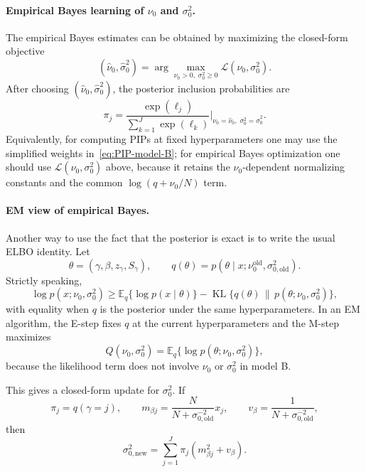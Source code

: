 \documentclass[11pt]{article}
\newcommand{\E}{\mathbb E}
\begin{document}
\paragraph{Empirical Bayes learning of $\nu_0$ and $\sigma_0^2$.}
The empirical Bayes estimates can be obtained by maximizing the closed-form
objective
\[
(\hat\nu_0,\hat\sigma_0^2)
=
\arg\max_{\nu_0>0,\;\sigma_0^2\ge 0}
\mathcal L(\nu_0,\sigma_0^2).
\]
After choosing $(\hat\nu_0,\hat\sigma_0^2)$, the posterior inclusion
probabilities are
\[
\pi_j
=
\frac{\exp(\ell_j)}
{\sum_{k=1}^J \exp(\ell_k)}
\bigg|_{\nu_0=\hat\nu_0,\;\sigma_0^2=\hat\sigma_0^2}.
\]
Equivalently, for computing PIPs at fixed hyperparameters one may use the
simplified weights in~\eqref{eq:PIP-model-B}; for empirical Bayes optimization
one should use $\mathcal L(\nu_0,\sigma_0^2)$ above, because it retains the
$\nu_0$-dependent normalizing constants and the common
$\log(q+\nu_0/N)$ term.

\paragraph{EM view of empirical Bayes.}
Another way to use the fact that the posterior is exact is to write the usual
ELBO identity. Let
\[
\theta=(\gamma,\beta,z_\gamma,S_\gamma),
\qquad
q(\theta)=p(\theta\mid x;\nu_0^{\mathrm{old}},\sigma_{0,\mathrm{old}}^2).
\]
Strictly speaking,
\[
\log p(x;\nu_0,\sigma_0^2)
\ge
\E_q\{\log p(x\mid\theta)\}
-\operatorname{KL}\{q(\theta)\,\|\,p(\theta;\nu_0,\sigma_0^2)\},
\]
with equality when $q$ is the posterior under the same hyperparameters. In an
EM algorithm, the E-step fixes $q$ at the current hyperparameters and the
M-step maximizes
\[
Q(\nu_0,\sigma_0^2)
=
\E_q\{\log p(\theta;\nu_0,\sigma_0^2)\},
\]
because the likelihood term does not involve $\nu_0$ or $\sigma_0^2$ in model B.

This gives a closed-form update for $\sigma_0^2$. If
\[
\pi_j=q(\gamma=j),
\qquad
m_{\beta j}=\frac{N}{N+\sigma_{0,\mathrm{old}}^{-2}}x_j,
\qquad
v_\beta=\frac{1}{N+\sigma_{0,\mathrm{old}}^{-2}},
\]
then
\[
\boxed{
\sigma_{0,\mathrm{new}}^2
=
\sum_{j=1}^J \pi_j\left(m_{\beta j}^2+v_\beta\right).
}
\]
\end{document}
